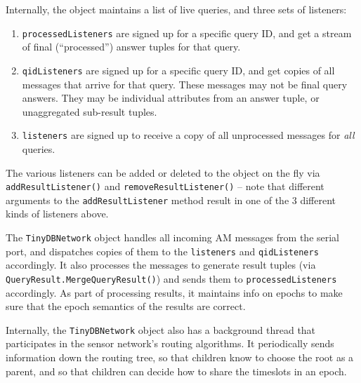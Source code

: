 \documentclass[11pt]{article}
\begin{document}
  Internally, the object maintains a list of live queries, and three
  sets of listeners:
  \begin{enumerate}
        \item {\tt processedListeners} are signed up for a specific query
    ID, and get a stream of final (``processed'') answer tuples for
    that query.
        \item {\tt qidListeners} are signed up for a specific query ID,
    and get copies of all messages that arrive for that query.  These
    messages may not be final query answers.  They may be individual
    attributes from an answer tuple, or unaggregated sub-result
    tuples.
        \item  {\tt listeners} are signed up to receive a copy of all
    unprocessed messages for {\em all} queries.  
  \end{enumerate}
  The various listeners can be added or deleted to the object on the
  fly via {\tt addResultListener()} and {\tt removeResultListener()}
  -- note that different arguments to the {\tt addResultListener}
  method result in one of the 3 different kinds of listeners above.

  The {\tt TinyDBNetwork} object handles all incoming
  AM messages from the
  serial port, and dispatches copies of them to the {\tt listeners}
  and {\tt qidListeners} accordingly.  It also processes the messages
  to generate result tuples (via {\tt QueryResult.MergeQueryResult()})
  and sends them to {\tt processedListeners} accordingly.  As part of
  processing results, it maintains info on epochs to make sure that
  the epoch semantics of the results are correct.

  Internally, the {\tt TinyDBNetwork} object also has a background thread
  that participates in the sensor network's routing algorithms.  It
  periodically sends information down the routing tree, so that
  children know to choose the root as a parent, and so that children
  can decide how to share the timeslots in an
  epoch.  
\end{document}
